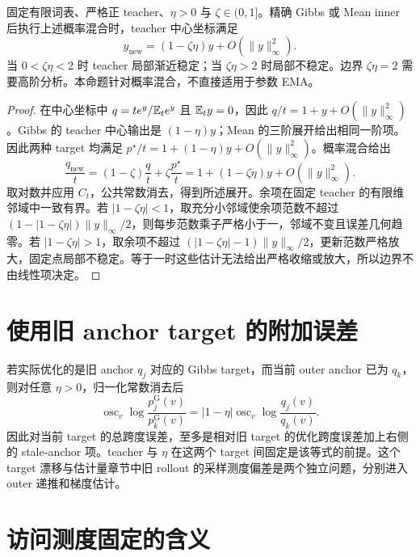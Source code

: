 \begin{proposition}
\label{dyn:soft-local}
固定有限词表、严格正 teacher、$\eta>0$ 与 $\zeta\in(0,1]$。精确 Gibbs 或 Mean inner 后执行上述概率混合时，teacher 中心坐标满足
\begin{equation}
y_{\mathrm{new}}=(1-\zeta\eta)y+O(\|y\|_\infty^2).
\end{equation}
当 $0<\zeta\eta<2$ 时 teacher 局部渐近稳定；当 $\zeta\eta>2$ 时局部不稳定。边界 $\zeta\eta=2$ 需要高阶分析。本命题针对概率混合，不直接适用于参数 EMA。
\end{proposition}
\begin{proof}
在中心坐标中 $q=t e^y/\mathbb E_te^y$ 且 $\mathbb E_ty=0$，因此 $q/t=1+y+O(\|y\|_\infty^2)$。Gibbs 的 teacher 中心输出是 $(1-\eta)y$；Mean 的三阶展开给出相同一阶项。因此两种 target 均满足 $p^\star/t=1+(1-\eta)y+O(\|y\|_\infty^2)$。概率混合给出
\begin{equation*}
\frac{q_{\mathrm{new}}}{t}
=(1-\zeta)\frac qt+\zeta\frac{p^\star}t
=1+(1-\zeta\eta)y+O(\|y\|_\infty^2).
\end{equation*}
取对数并应用 $C_t$，公共常数消去，得到所述展开。余项在固定 teacher 的有限维邻域中一致有界。若 $|1-\zeta\eta|<1$，取充分小邻域使余项范数不超过 $(1-|1-\zeta\eta|)\|y\|_\infty/2$，则每步范数乘子严格小于一，邻域不变且误差几何趋零。若 $|1-\zeta\eta|>1$，取余项不超过 $(|1-\zeta\eta|-1)\|y\|_\infty/2$，更新范数严格放大，固定点局部不稳定。等于一时这些估计无法给出严格收缩或放大，所以边界不由线性项决定。
\end{proof}

\section{使用旧 anchor target 的附加误差}

若实际优化的是旧 anchor $q_j$ 对应的 Gibbs target，而当前 outer anchor 已为 $q_k$，则对任意 $\eta>0$，归一化常数消去后
\begin{equation*}
 \operatorname{osc}_v
 \log\frac{p_j^{\mathrm G}(v)}
          {p_k^{\mathrm G}(v)}
 =|1-\eta|\operatorname{osc}_v\log\frac{q_j(v)}{q_k(v)}.
\end{equation*}
因此对当前 target 的总跨度误差，至多是相对旧 target 的优化跨度误差加上右侧的 stale-anchor 项。teacher 与 $\eta$ 在这两个 target 间固定是该等式的前提。这个 target 漂移与估计量章节中旧 rollout 的采样测度偏差是两个独立问题，分别进入 outer 递推和梯度估计。

\section{访问测度固定的含义}

